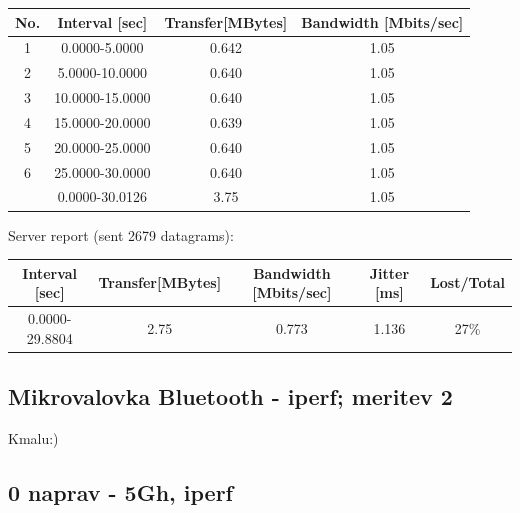 \documentclass[11pt,a4paper,slovene]{article}
\begin{document}
\begin{table}[H]
	\begin{adjustwidth}{-3cm}{-3cm}
	\centering
		\begin{tabular}{c|c|c|c}
		\hline
		\textbf{No.} & \textbf{Interval [sec]} & \textbf{Transfer[MBytes]} & \textbf{Bandwidth [Mbits/sec]}\\
     	\hline
     	1 & 0.0000-5.0000 & 0.642 & 1.05\\
  		2 & 5.0000-10.0000 & 0.640 & 1.05\\
  		3 & 10.0000-15.0000 & 0.640 & 1.05\\
  		4 & 15.0000-20.0000 & 0.639 & 1.05\\
  		5 & 20.0000-25.0000 & 0.640 & 1.05\\
  		6 & 25.0000-30.0000 & 0.640 & 1.05\\
  		\hline
  		& 0.0000-30.0126 & 3.75 & 1.05\\
  		\hline
    		\end{tabular}
    	\end{adjustwidth}
\end{table}

Server report (sent 2679 datagrams):\\

\begin{table}[H]
	\begin{adjustwidth}{-3cm}{-3cm}
	\centering
		\begin{tabular}{c|c|c|c|c}
		\hline
		\textbf{Interval [sec]} & \textbf{Transfer[MBytes]} & \textbf{Bandwidth [Mbits/sec]} & \textbf{Jitter [ms]} & \textbf{Lost/Total}\\
     	\hline
     	0.0000-29.8804 & 2.75 & 0.773 & 1.136 & 27\%\\
  		\hline
    		\end{tabular}
    	\end{adjustwidth}
\end{table}

\subsection{Mikrovalovka Bluetooth - iperf; meritev 2}

Kmalu:)\\

\subsection{0 naprav - 5Gh, iperf}
\end{document}
